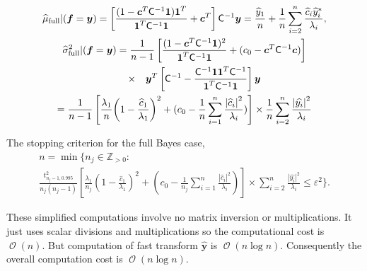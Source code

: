 \documentclass[smallextended]{svjour3}       %
\DeclareMathOperator{\Order}{{\mathcal O}}
\newcommand{\bm}[1]{\boldsymbol{#1}}
\newcommand{\posIntegers}{\mathbb{Z}_{> 0}}
\newcommand{\vc}{\bm{c}}
\newcommand{\vf}{\bm{f}}
\newcommand{\vy}{\bm{y}}
\newcommand{\vone}{\bm{1}}
\newcommand{\mC}{\mathsf{C}}
\def\abs#1{\ensuremath{\left \lvert #1 \right \rvert}}
\begin{document}
\begin{gather}\label{FJH:eq:cubFull}
\widehat{\mu}_{\textup{full}}  \vert ( \vf = \vy) = \left[\frac{(1 -  \vc^T \mC^{-1}\vone)\vone^T}{\vone^T \mC^{-1} \vone} + \vc^T \right] \mC^{-1}  \vy = 
 \frac{\widehat{y}_1}{n} +
 \frac 1n \sum_{i=2}^n \frac{ \widehat{c}_i \widehat{y}_i^*}{\lambda_i},
\\
\label{FJH:eq:signmaFull}
\widehat{\sigma}^2_{\textup{full}}  \vert ( \vf = \vy)  
= \frac{1}{n-1}
\left[\frac{(1 - \vc^T \mC^{-1} \vone)^2}{\vone^T \mC^{-1} \vone} + (c_0  -\vc ^T \mC^{-1} \vc) \right] 
\\
\nonumber
\qquad \times \quad \vy^T\left[ \mC^{-1} 
- \frac{ \mC^{-1} \vone\vone^T \mC^{-1}}{\vone^T \mC^{-1} \vone}  \right]\vy 
\\ \nonumber
=
\frac{1}{n-1} \left[\frac{\lambda_1}{n}{\left(1 - \frac{\widehat{c}_1}{\lambda_1}\right)^2} + (c_0  - \frac 1n \sum_{i=1}^n \frac{\abs{\widehat{c}_i}^2}{\lambda_i}) \right] 
\times
\frac{1}{n} \sum_{i=2}^n \frac{\abs{\widehat{y_i}}^2}{\lambda_i}
\end{gather}

The stopping criterion for the full Bayes case,  
\begin{multline} \label{FJH:eq:stopcritHyper}
n  = \min \biggl \{n_j \in \posIntegers:  
\\
\frac {t_{n_j-1,0.995}^2}{n_j(n_j - 1)}  
\left[\frac{\lambda_1}{n_j}{\left(1 - \frac{\widehat{c}_1}{\lambda_1}\right)^2} + (c_0  - \frac{1}{n_j} \sum_{i=1}^n \frac{\abs{\widehat{c}_i}^2}{\lambda_i}) \right] 
 \times \sum_{i=2}^n \frac{\abs{\widehat{y_i}}^2}{\lambda_i}  \le \varepsilon^2 \biggr\}.
\end{multline}


These simplified computations involve no matrix inversion or multiplications. 
It just uses scalar divisions and multiplications so the computational cost is $\Order(n)$. 
But computation of fast transform $\widehat{\vy}$ is $\Order(n \log n)$.  Consequently the overall computation cost is $\Order(n \log n )$. 
\end{document}
